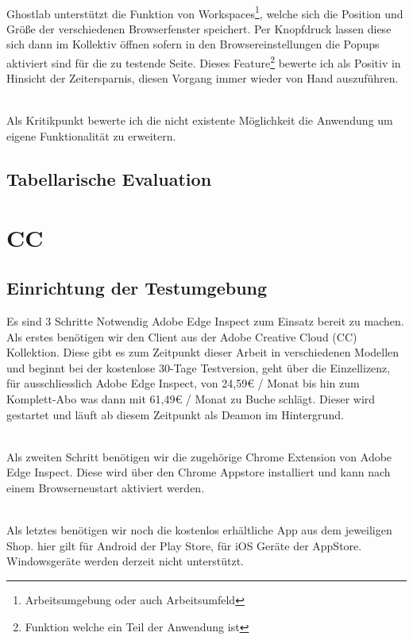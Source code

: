 		\\Ghostlab unterstützt die Funktion von Workspaces\footnote{Arbeitsumgebung oder auch Arbeitsumfeld}, welche sich die 		Position und Größe der verschiedenen Browserfenster speichert. Per Knopfdruck lassen diese sich dann im Kollektiv öffnen 		sofern in den Browsereinstellungen die Popups aktiviert sind für die zu testende Seite. Dieses Feature\footnote{Funktion 			welche ein Teil der Anwendung ist} bewerte ich als Positiv in Hinsicht der Zeitersparnis, diesen Vorgang immer wieder von 		Hand auszuführen.

		\\Als Kritikpunkt bewerte ich die nicht existente Möglichkeit die Anwendung um eigene Funktionalität zu erweitern.

		\subsection{Tabellarische Evaluation}
	
	\pagebreak
	\section{ CC }
		\subsection {Einrichtung der Testumgebung}
		Es sind 3 Schritte Notwendig Adobe Edge Inspect zum Einsatz bereit zu machen. Als erstes benötigen wir den Client aus 		der Adobe Creative Cloud (CC) Kollektion. Diese gibt es zum Zeitpunkt dieser Arbeit in verschiedenen Modellen und 			beginnt bei der kostenlose 30-Tage Testversion, geht über die Einzellizenz, für ausschliesslich Adobe Edge Inspect, von 			24,59€ / Monat bis hin zum Komplett-Abo was dann mit 61,49€ / Monat zu Buche schlägt. Dieser wird gestartet und läuft 		ab diesem Zeitpunkt als Deamon im Hintergrund. 
		
		\\Als zweiten Schritt benötigen wir die zugehörige Chrome Extension von Adobe Edge Inspect. Diese wird über den Chrome 		Appstore installiert und kann nach einem Browserneustart aktiviert werden.
		
		\\Als letztes benötigen wir noch die kostenlos erhältliche App aus dem jeweiligen Shop. hier gilt für Android der Play Store, 		für iOS Geräte der AppStore. Windowsgeräte werden derzeit nicht unterstützt.
		
